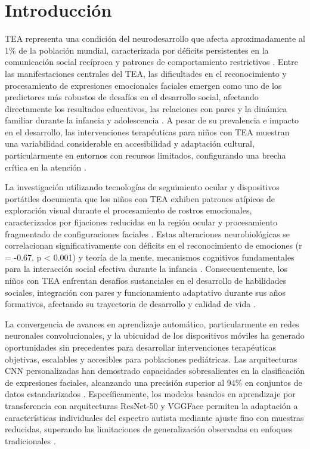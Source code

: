\documentclass{ieeeaccess}
\begin{document}
	\titlepgskip=-21pt
	
	\maketitle
	
	\section{Introducción}
	\label{sec:introduction}
	
	 TEA representa una condición del neurodesarrollo que afecta aproximadamente al 1\% de la población mundial, caracterizada por déficits persistentes en la comunicación social recíproca y patrones de comportamiento restrictivos \cite{b1}. Entre las manifestaciones centrales del TEA, las dificultades en el reconocimiento y procesamiento de expresiones emocionales faciales emergen como uno de los predictores más robustos de desafíos en el desarrollo social, afectando directamente los resultados educativos, las relaciones con pares y la dinámica familiar durante la infancia y adolescencia \cite{b2,b3}. A pesar de su prevalencia e impacto en el desarrollo, las intervenciones terapéuticas para niños con TEA muestran una variabilidad considerable en accesibilidad y adaptación cultural, particularmente en entornos con recursos limitados, configurando una brecha crítica en la atención \cite{b4,b5}.
	
	La investigación utilizando tecnologías de seguimiento ocular y dispositivos portátiles documenta que los niños con TEA exhiben patrones atípicos de exploración visual durante el procesamiento de rostros emocionales, caracterizados por fijaciones reducidas en la región ocular y procesamiento fragmentado de configuraciones faciales \cite{b3}. Estas alteraciones neurobiológicas se correlacionan significativamente con déficits en el reconocimiento de emociones (r = -0.67, p < 0.001) y teoría de la mente, mecanismos cognitivos fundamentales para la interacción social efectiva durante la infancia \cite{b6}. Consecuentemente, los niños con TEA enfrentan desafíos sustanciales en el desarrollo de habilidades sociales, integración con pares y funcionamiento adaptativo durante sus años formativos, afectando su trayectoria de desarrollo y calidad de vida \cite{b5}.
	
	La convergencia de avances en aprendizaje automático, particularmente en redes neuronales convolucionales, y la ubicuidad de los dispositivos móviles ha generado oportunidades sin precedentes para desarrollar intervenciones terapéuticas objetivas, escalables y accesibles para poblaciones pediátricas. Las arquitecturas CNN personalizadas han demostrado capacidades sobresalientes en la clasificación de expresiones faciales, alcanzando una precisión superior al 94\% en conjuntos de datos estandarizados \cite{b2}. Específicamente, los modelos basados en aprendizaje por transferencia con arquitecturas ResNet-50 y VGGFace permiten la adaptación a características individuales del espectro autista mediante ajuste fino con muestras reducidas, superando las limitaciones de generalización observadas en enfoques tradicionales \cite{b7}.
	
\end{document}
